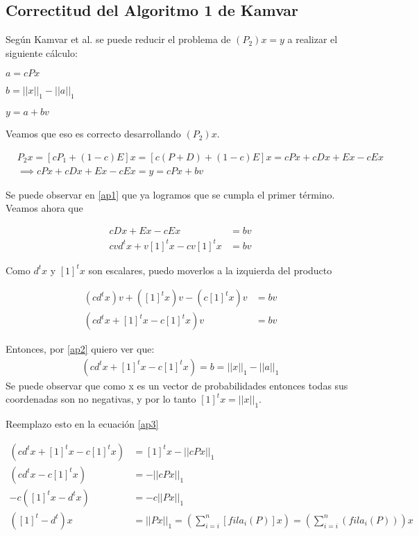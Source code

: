 \subsection{Correctitud del Algoritmo 1 de Kamvar} 
Seg\'un Kamvar et al. se puede reducir el problema de $(P_{2})x = y$ a realizar el siguiente c\'alculo:

	$a = cPx$

	$b = ||x||_{1} - ||a||_{1}$

	$y = a + bv$

Veamos que eso es correcto desarrollando $(P_{2})x$.

\begin{align}
	& P_{2}x = [cP_{1} + (1-c)E]x = [c(P + D) + (1-c)E]x = cPx + cDx + Ex -cEx \nonumber\\
	& \implies cPx + cDx + Ex -cEx = y= cPx +bv \label{ap1}
\end{align}

Se puede observar en \ref{ap1} que ya logramos que se cumpla el primer t\'ermino. Veamos ahora que  

\begin{align*}
	cDx + Ex -cEx &= bv \\
	cvd^{t}x + v[1]^{t}x - cv[1]^{t}x &= bv
\end{align*}

Como $d^{t}x$ y $[1]^{t}x$ son escalares, puedo moverlos a la izquierda del producto

\begin{align}
	(cd^{t}x)v + ([1]^{t}x)v - (c[1]^{t}x)v &= bv \nonumber\\
	(cd^{t}x +[1]^{t}x - c[1]^{t}x)v &= bv \label{ap2}
\end{align}

Entonces, por \eqref{ap2} quiero ver que:
\begin{align}
	(cd^{t}x +[1]^{t}x - c[1]^{t}x) = b = ||x||_{1} - ||a||_{1}\label{ap3}
\end{align}
Se puede observar que como x es un vector de probabilidades entonces todas sus coordenadas son no negativas, y por lo tanto $[1]^{t}x = ||x||_{1}.$

Reemplazo esto en la ecuaci\'on \eqref{ap3}

\begin{align}
(cd^{t}x +[1]^{t}x - c[1]^{t}x) &= [1]^{t}x - ||cPx||_{1} \nonumber\\
(cd^{t}x-c[1]^{t}x) &= -||cPx||_{1} \nonumber\\
-c([1]^{t}x-d^{t}x) &= -c||Px||_{1} \nonumber\\
([1]^{t} -d^{t})x &= ||Px||_{1} = \left(\sum_{i=i}^{n}[fila_{i}(P)]x\right) = \left(\sum_{i=i}^{n}(fila_{i}(P))\right)x \label{ap4}
\end{align}


